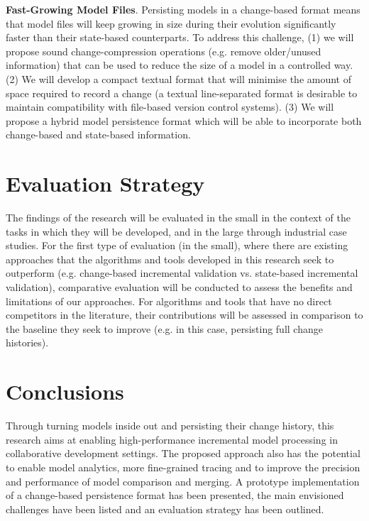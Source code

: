 \documentclass[conference]{IEEEtran}
\begin{document}
\textbf{Fast-Growing Model Files}. Persisting models in a change-based format means that model files will keep growing in size during their evolution significantly faster than their state-based counterparts. To address this challenge, (1) we will propose sound change-compression operations (e.g. remove older/unused information) that can be used to reduce the size of a model in a controlled way. (2) We will develop a compact textual format that will minimise the amount of space required to record a change (a textual line-separated format is desirable to maintain compatibility with file-based version control systems). (3) We will propose a hybrid model persistence format which will be able to incorporate both change-based and state-based information. 

\section{Evaluation Strategy}
\label{sec:evaluation_strategy}
The findings of the research will be evaluated in the small in the context of the tasks in which they will be developed, and in the large through industrial case studies. For the first type of evaluation (in the small), where there are existing approaches that the algorithms and tools developed in this research seek to outperform (e.g. change-based incremental validation vs. state-based incremental validation), comparative evaluation will be conducted to assess the benefits and limitations of our approaches. For algorithms and tools that have no direct competitors in the literature, their contributions will be assessed in comparison to the baseline they seek to improve (e.g. in this case, persisting full change histories). %

\section{Conclusions}
\label{sec:conclusions}
Through turning models inside out and persisting their change history, this research aims at enabling high-performance incremental model processing in collaborative development settings. The proposed approach also has the potential to enable model analytics, more fine-grained tracing and to improve the precision and performance of model comparison and merging. A prototype implementation of a change-based persistence format has been presented, the main envisioned challenges have been listed and an evaluation strategy has been outlined. %
\end{document}

